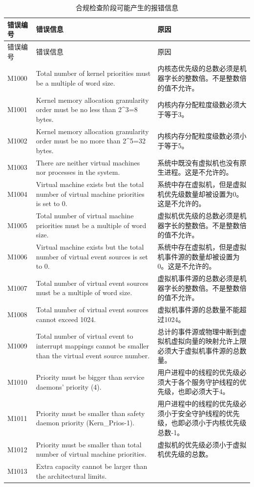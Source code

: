 \begin{xltabular}{\textwidth}{@{}>{\hsize\raggedright\arraybackslash}X>{\hsize\raggedright\arraybackslash}X>{\hsize\raggedright\arraybackslash}X@{}}
\caption{合规检查阶段可能产生的报错信息}\label{tab:5-20}\\
\toprule
错误编号 & 错误信息 & 原因\tabularnewline
\endfirsthead
\toprule
错误编号 & 错误信息 & 原因\tabularnewline
\midrule
\endhead
\bottomrule
\endlastfoot
M1000 & Total number of kernel priorities must be a multiple of word
size. &
内核态优先级的总数必须是机器字长的整数倍。不是整数倍的值不允许。\tabularnewline
M1001 & Kernel memory allocation granularity order must be no less than
2\^{}3=8 bytes. & 内核内存分配粒度级数必须大于等于3。\tabularnewline
M1002 & Kernel memory allocation granularity order must be no more than
2\^{}5=32 bytes. & 内核内存分配粒度级数必须小于等于5。\tabularnewline
M1003 & There are neither virtual machines nor processes in the system.
& 系统中既没有虚拟机也没有原生进程。这是不允许的。\tabularnewline
M1004 & Virtual machine exists but the total number of virtual machine
priorities is set to 0. &
系统中存在虚拟机，但是虚拟机优先级数量却被设置为0。这是不允许的。\tabularnewline
M1005 & Total number of virtual machine priorities must be a multiple of
word size. &
虚拟机优先级的总数必须是机器字长的整数倍。不是整数倍的值不允许。\tabularnewline
M1006 & Virtual machine exists but the total number of virtual event
sources is set to 0. &
系统中存在虚拟机，但是虚拟机事件源的数量却被设置为0。这是不允许的。\tabularnewline
M1007 & Total number of virtual event sources must be a multiple of word
size. &
虚拟机事件源的总数必须是机器字长的整数倍。不是整数倍的值不允许。\tabularnewline
M1008 & Total number of virtual event sources cannot exceed 1024. &
虚拟机事件源的总数量不能超过1024。\tabularnewline
M1009 & Total number of virtual event to interrupt mappings cannot be
smaller than the virtual event source number. &
总计的事件源或物理中断到虚拟机虚拟向量的映射允许上限必须大于虚拟机事件源的总数量。\tabularnewline
M1010 & Priority must be bigger than service daemons' priority (4). &
用户进程中的线程的优先级必须大于各个服务守护线程的优先级，也即必须大于4。\tabularnewline
M1011 & Priority must be smaller than safety daemon priority
(Kern\_\allowbreak{}Prios-1). &
用户进程中的线程的优先级必须小于安全守护线程的优先级，也即必须小于内核优先级总数-1。\tabularnewline
M1012 & Priority must be smaller than total number of virtual machine
priorities. & 虚拟机的优先级必须小于虚拟机优先级的总数。\tabularnewline
M1013 & Extra capacity cannot be larger than the architectural limits. &

\end{xltabular}
